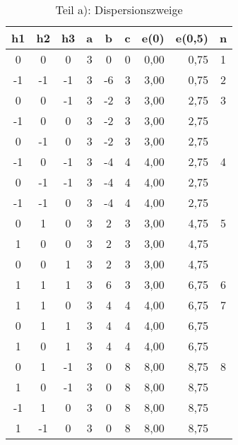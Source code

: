 \begin{table}[htbp]
\caption{Teil a): Dispersionszweige}
\begin{center}
\begin{tabular}{|c|c|c|c|c|c|r|r|c|}
\hline
\textbf{h1} & \textbf{h2} & \textbf{h3} & \textbf{a} & \textbf{b} & \textbf{c} & \multicolumn{1}{c|}{\textbf{e(0)}} & \multicolumn{1}{c|}{\textbf{e(0,5)}} & \textbf{n} \\ \hline
0 & 0 & 0 & 3 & 0 & 0 & 0,00 & 0,75 & 1 \\ \hline
-1 & -1 & -1 & 3 & -6 & 3 & 3,00 & 0,75 & 2 \\ \hline
0 & 0 & -1 & 3 & -2 & 3 & 3,00 & 2,75 & \multicolumn{ 1}{c|}{3} \\ \cline{ 1- 8}
-1 & 0 & 0 & 3 & -2 & 3 & 3,00 & 2,75 & \multicolumn{ 1}{c|}{} \\ \cline{ 1- 8}
0 & -1 & 0 & 3 & -2 & 3 & 3,00 & 2,75 & \multicolumn{ 1}{c|}{} \\ \hline
-1 & 0 & -1 & 3 & -4 & 4 & 4,00 & 2,75 & \multicolumn{ 1}{c|}{4} \\ \cline{ 1- 8}
0 & -1 & -1 & 3 & -4 & 4 & 4,00 & 2,75 & \multicolumn{ 1}{c|}{} \\ \cline{ 1- 8}
-1 & -1 & 0 & 3 & -4 & 4 & 4,00 & 2,75 & \multicolumn{ 1}{c|}{} \\ \hline
0 & 1 & 0 & 3 & 2 & 3 & 3,00 & 4,75 & \multicolumn{ 1}{c|}{5} \\ \cline{ 1- 8}
1 & 0 & 0 & 3 & 2 & 3 & 3,00 & 4,75 & \multicolumn{ 1}{c|}{} \\ \cline{ 1- 8}
0 & 0 & 1 & 3 & 2 & 3 & 3,00 & 4,75 & \multicolumn{ 1}{c|}{} \\ \hline
1 & 1 & 1 & 3 & 6 & 3 & 3,00 & 6,75 & 6 \\ \hline
1 & 1 & 0 & 3 & 4 & 4 & 4,00 & 6,75 & \multicolumn{ 1}{c|}{7} \\ \cline{ 1- 8}
0 & 1 & 1 & 3 & 4 & 4 & 4,00 & 6,75 & \multicolumn{ 1}{c|}{} \\ \cline{ 1- 8}
1 & 0 & 1 & 3 & 4 & 4 & 4,00 & 6,75 & \multicolumn{ 1}{c|}{} \\ \hline
0 & 1 & -1 & 3 & 0 & 8 & 8,00 & 8,75 & \multicolumn{ 1}{c|}{8} \\ \cline{ 1- 8}
1 & 0 & -1 & 3 & 0 & 8 & 8,00 & 8,75 & \multicolumn{ 1}{c|}{} \\ \cline{ 1- 8}
-1 & 1 & 0 & 3 & 0 & 8 & 8,00 & 8,75 & \multicolumn{ 1}{c|}{} \\ \cline{ 1- 8}
1 & -1 & 0 & 3 & 0 & 8 & 8,00 & 8,75 & \multicolumn{ 1}{c|}{} \\ \cline{ 1- 8}

\end{tabular}
\end{center}
\end{table}
